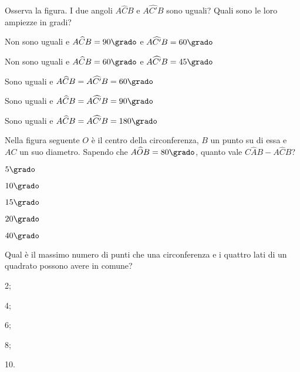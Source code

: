 \noindent\begin{minipage}{0.65\textwidth}\parindent15pt
\begin{esercizio}
\label{ese:5.61}
Osserva la figura. I due angoli \(A\widehat{C}B\) e \(A\widehat{C'}B\) 
sono uguali? Quali sono le loro ampiezze in gradi?
\begin{enumeratea}
\item Non sono uguali e \(A\widehat{C}B=90\grado\) e 
\(A\widehat{C'}B=60\grado\)
\item Non sono uguali e \(A\widehat{C}B=60\grado\) e 
\(A\widehat{C'}B=45\grado\)
\item Sono uguali e \(A\widehat{C}B=A\widehat{C'}B=60\grado\)
\item Sono uguali e \(A\widehat{C}B=A\widehat{C'}B=90\grado\)
\item Sono uguali e \(A\widehat{C}B=A\widehat{C'}B=180\grado\)
\end{enumeratea}
\end{esercizio}
\end{minipage}\hfil
\begin{minipage}{0.35\textwidth}
	\centering
\end{minipage}\vspace{5pt}

\noindent\begin{minipage}{0.7\textwidth}\parindent15pt
\begin{esercizio}
\label{ese:5.62}
Nella figura seguente \(O\) è il centro della circonferenza, \(B\) un 
punto su di essa e \(AC\) un suo diametro. Sapendo che 
\(A\widehat{O}B=80\grado\), quanto vale \(C\widehat{A}B-A\widehat{C}B\)?
\begin{enumeratea}
\item \(5\grado\)
\item \(10\grado\)
\item \(15\grado\)
\item \(20\grado\)
\item \(40\grado\)
\end{enumeratea}
\end{esercizio}
\end{minipage}\hfil
\begin{minipage}{0.3\textwidth}
	\centering
\end{minipage}\vspace{5pt}

\begin{esercizio}
\label{ese:5.63}
Qual è il massimo numero di punti che una circonferenza e i quattro 
lati di un quadrato possono avere in comune?
\begin{multicols}{5}
\begin{enumeratea}
\item 2;
\item 4;
\item 6;
\item 8;
\item 10.
\end{enumeratea}
\end{multicols}
\end{esercizio}

